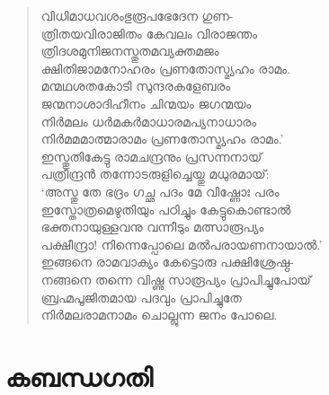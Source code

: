 \begin{verse}
വിധിമാധവശംഭുരൂപഭേദേന ഗുണ-\\
ത്രിതയവിരാജിതം കേവലം വിരാജന്തം\\
ത്രിദശമുനിജനസ്തുതമവ്യക്തമജം\\
ക്ഷിതിജാമനോഹരം പ്രണതോസ്മ്യഹം രാമം.\\
മന്മഥശതകോടി സുന്ദരകളേബരം\\
ജന്മനാശാദിഹീനം ചിന്മയം ജഗന്മയം\\
നിര്‍മലം ധര്‍മകര്‍മാധാരമപ്യനാധാരം\\
നിര്‍മമമാത്മാരാമം പ്രണതോസ്മ്യഹം രാമം.’\\
ഇസ്തുതികേട്ടു രാമചന്ദ്രനും പ്രസന്നനായ്\\
പത്രീന്ദ്രന്‍ തന്നോടരുളിച്ചെയ്തു മധുരമായ്:\\
‘അസ്തു തേ ഭദ്രം ഗച്ഛ പദം മേ വിഷ്ണോഃ പരം\\
ഇസ്തോത്രമെഴുതിയും പഠിച്ചും കേട്ടുകൊണ്ടാല്‍\\
ഭക്തനായുള്ളവനു വന്നീടും മത്സാരൂപ്യം\\
പക്ഷീന്ദ്രാ! നിന്നെപ്പോലെ മല്‍പരായണനായാല്‍.’\\
ഇങ്ങനെ രാമവാക്യം കേട്ടൊരു പക്ഷിശ്രേഷ്ഠ-\\
നങ്ങനെ തന്നെ വിഷ്ണു സാരൂപ്യം പ്രാപിച്ചുപോയ്\\
ബ്രഹ്മപൂജിതമായ പദവും പ്രാപിച്ചുതേ\\
നിര്‍മലരാമനാമം ചൊല്ലുന്ന ജനം പോലെ.
\end{verse}

\section{കബന്ധഗതി}

